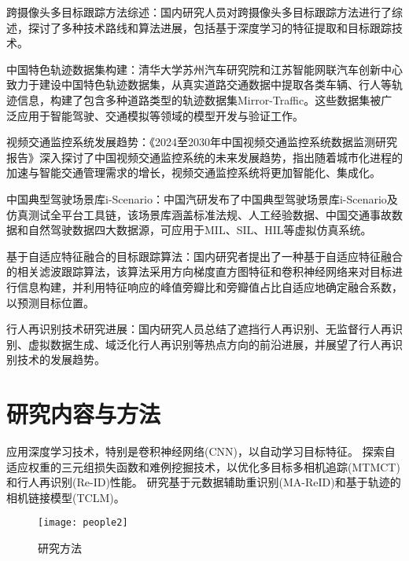 跨摄像头多目标跟踪方法综述：国内研究人员对跨摄像头多目标跟踪方法进行了综述，探讨了多种技术路线和算法进展，包括基于深度学习的特征提取和目标跟踪技术。

中国特色轨迹数据集构建：清华大学苏州汽车研究院和江苏智能网联汽车创新中心致力于建设中国特色轨迹数据集，从真实道路交通数据中提取各类车辆、行人等轨迹信息，构建了包含多种道路类型的轨迹数据集Mirror-Traffic。这些数据集被广泛应用于智能驾驶、交通模拟等领域的模型开发与验证工作。

视频交通监控系统发展趋势：《2024至2030年中国视频交通监控系统数据监测研究报告》深入探讨了中国视频交通监控系统的未来发展趋势，指出随着城市化进程的加速与智能交通管理需求的增长，视频交通监控系统将更加智能化、集成化。

中国典型驾驶场景库i-Scenario：中国汽研发布了中国典型驾驶场景库i-Scenario及仿真测试全平台工具链，该场景库涵盖标准法规、人工经验数据、中国交通事故数据和自然驾驶数据四大数据源，可应用于MIL、SIL、HIL等虚拟仿真系统。

基于自适应特征融合的目标跟踪算法：国内研究者提出了一种基于自适应特征融合的相关滤波跟踪算法，该算法采用方向梯度直方图特征和卷积神经网络来对目标进行信息构建，并利用特征响应的峰值旁瓣比和旁瓣值占比自适应地确定融合系数，以预测目标位置。

行人再识别技术研究进展：国内研究人员总结了遮挡行人再识别、无监督行人再识别、虚拟数据生成、域泛化行人再识别等热点方向的前沿进展，并展望了行人再识别技术的发展趋势。

\section{研究内容与方法}

应用深度学习技术，特别是卷积神经网络(CNN)，以自动学习目标特征。
探索自适应权重的三元组损失函数和难例挖掘技术，以优化多目标多相机追踪(MTMCT)和行人再识别(Re-ID)性能。
研究基于元数据辅助重识别(MA-ReID)和基于轨迹的相机链接模型(TCLM)。

\begin{figure}[htbp] %
	\centering
	\texttt{[image: people2]} %
	\caption{研究方法} %
	\label{fig:people2} %
\end{figure}

